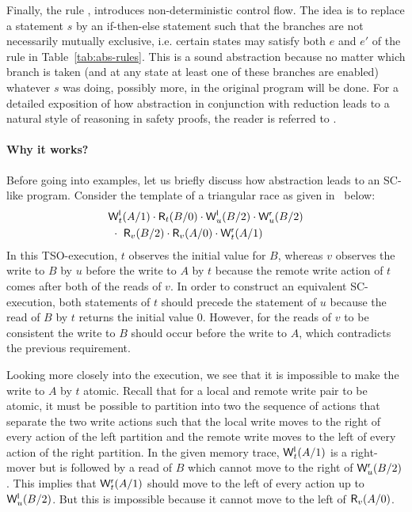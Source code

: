 \documentclass[preprint,9pt]{sigplanconf}
\begin{document}
Finally, the rule {}, introduces non-deterministic control flow.
The idea is to replace a statement $s$ by an if-then-else statement such that the branches are not necessarily mutually exclusive, i.e. certain states may satisfy both $e$ and $e'$ of the rule in Table~\ref{tab:abs-rules}.
This is a sound abstraction because no matter which branch is taken (and at any state at least one of these branches are enabled) whatever $s$ was doing, possibly more, in the original program will be done.  
For a detailed exposition of how abstraction in conjunction with reduction leads to a natural style of reasoning in safety proofs, the reader is referred to \cite{EQT2009}.

\paragraph{Why it works?}
Before going into examples, let us briefly discuss how abstraction leads to an SC-like program. 
Consider the template of a triangular race as given in~\cite{Owe2010} below:
\begin{eqnarray*}
&\mathsf{W}^{\mathsf{l}}_{t}(A/1) \cdot \mathsf{R}_{t}(B/0) \cdot \mathsf{W}^{\mathsf{l}}_{u}(B/2) \cdot \mathsf{W}^{\mathsf{r}}_{u}(B/2)\\
&\ \cdot\ \mathsf{R}_{v}(B/2) \cdot \mathsf{R}_{v}(A/0) \cdot \mathsf{W}^{\mathsf{r}}_{t}(A/1)
\end{eqnarray*}
In this TSO-execution, $t$ observes the initial value for $B$, whereas $v$ observes the write to $B$ by $u$ before the write to $A$ by $t$ because the remote write action of $t$ comes after both of the reads of $v$.
In order to construct an equivalent SC-execution, both statements of $t$ should precede the statement of $u$ because the read of $B$ by $t$ returns the initial value 0.
However, for the reads of $v$ to be consistent the write to $B$ should occur before the write to $A$, which contradicts the previous requirement.

Looking more closely into the execution, we see that it is impossible to make the write to $A$ by $t$ atomic. 
Recall that for a local and remote write pair to be atomic, it must be possible to partition into two the sequence of actions that separate the two write actions such that the local write moves to the right of every action of the left partition and the remote write moves to the left of every action of the right partition.
In the given memory trace, $\mathsf{W}^{\mathsf{l}}_{t}(A/1)$ is a right-mover but is followed by a read of $B$ which cannot move to the right of $\mathsf{W}^{\mathsf{r}}_{u}(B/2)$.
This implies that $\mathsf{W}^{\mathsf{r}}_{t}(A/1)$ should move to the left of every action up to $\mathsf{W}^{\mathsf{l}}_{u}(B/2)$.
But this is impossible because it cannot move to the left of $\mathsf{R}_{v}(A/0)$.
\end{document}
